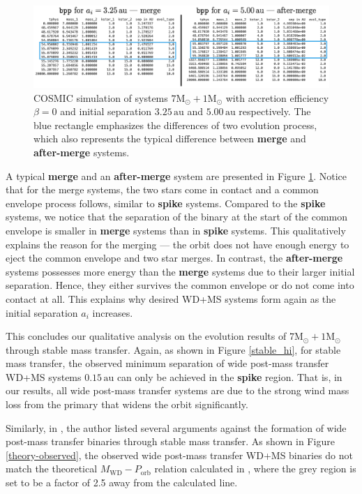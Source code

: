 \documentclass[12pt]{article}
\newcommand{\Msun}{\mathrm{M_{\odot}}}
\newcommand{\au}{\, \mathrm{au}}
\begin{document}
\begin{figure}
    \centering
    \includegraphics[width=\linewidth]{merge-after-merge.png}
    \caption{COSMIC simulation of systems $7 \Msun + 1 \Msun$ with accretion efficiency $\beta = 0$ and initial separation $3.25 \au$ and $5.00 \au$ respectively. The blue rectangle emphasizes the differences of two evolution process, which also represents the typical difference between \textbf{merge} and \textbf{after-merge} systems.}
    \label{merge-after-merge}
\end{figure}

A typical \textbf{merge} and an \textbf{after-merge} system are presented in Figure \ref{merge-after-merge}. Notice that for the merge systems, the two stars come in contact and a common envelope process follows, similar to \textbf{spike} systems. Compared to the \textbf{spike} systems, we notice that the separation of the binary at the start of the common envelope is smaller in \textbf{merge} systems than in \textbf{spike} systems. This qualitatively explains the reason for the merging — the orbit does not have enough energy to eject the common envelope and two star merges. In contrast, the \textbf{after-merge} systems possesses more energy than the \textbf{merge} systems due to their larger initial separation. Hence, they either survives the common envelope or do not come into contact at all. This explains why desired WD+MS systems form again as the initial separation $a_i$ increases.

This concludes our qualitative analysis on the evolution results of $7\Msun + 1\Msun$ through stable mass transfer. Again, as shown in Figure \ref{stable_hi}, for stable mass transfer, the observed minimum separation of wide post-mass transfer WD+MS systems $0.15 \au$ can only be achieved in the \textbf{spike} region. That is, in our results, all wide post-mass transfer systems are due to the strong wind mass loss from the primary that widens the orbit significantly.

Similarly, in \cite{yamaguchi_lo}, the author listed several arguments against the formation of wide post-mass transfer binaries through stable mass transfer. As shown in Figure \ref{theory-observed}, the observed wide post-mass transfer WD+MS binaries do not match the theoretical $M_{\mathrm{WD}} - P_{\mathrm{orb}}$ relation calculated in \cite{rappaport1995relation}, where the grey region is set to be a factor of 2.5 away from the calculated line.
\end{document}
